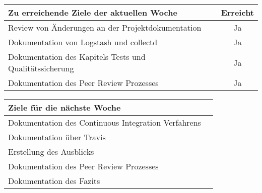 \begin{tabularx}{\textwidth}{Xc}
    \arrayrulecolor{OliveGreen}
    \toprule
    {\bfseries Zu erreichende Ziele der aktuellen Woche} & {\bfseries Erreicht} \\
    \midrule[2pt]
    Review von Änderungen an der Projektdokumentation    &Ja                    \\
    \rowcolor{OliveGreen!15}
    Dokumentation von Logstash und collectd              &Ja                    \\
    \rowcolor{White}
    Dokumentation des Kapitels Tests und Qualitätssicherung &Ja                 \\
    \rowcolor{OliveGreen!15}
    Dokumentation des Peer Review Prozesses              &Ja                    \\
    \bottomrule[2pt]
\end{tabularx}
%
\vspace{1cm}
%
\begin{tabularx}{\textwidth}{Xc}
    \arrayrulecolor{OliveGreen}
    \toprule
    {\bfseries Ziele für die nächste Woche}              &                      \\
    \midrule[2pt]
    Dokumentation des Continuous Integration Verfahrens  &                      \\
    \rowcolor{OliveGreen!15}
    Dokumentation über Travis                            &                      \\
    \rowcolor{White}
    Erstellung des Ausblicks                             &                      \\
    \rowcolor{OliveGreen!15}
    Dokumentation des Peer Review Prozesses              &                      \\
    \rowcolor{White}
    Dokumentation des Fazits                             &                      \\
\end{tabularx}
